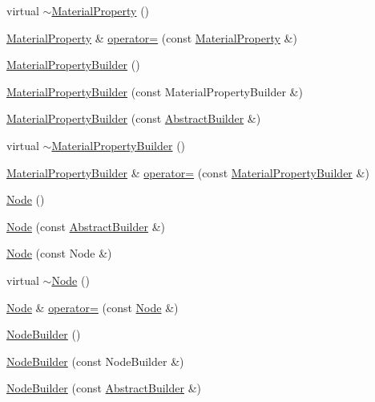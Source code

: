 \begin{DoxyCompactItemize}
\item 
virtual \hyperlink{namespacejli_a79beb0a52804d6f437114e88a6a133f3}{$\sim$\+Material\+Property} ()
\item 
\hyperlink{namespacejli_aac4773f4081fe5e6116c6e85803b59e0}{Material\+Property} \& \hyperlink{namespacejli_aeefe2ec73e0e0a8ec963ff328b8b7008}{operator=} (const \hyperlink{namespacejli_aac4773f4081fe5e6116c6e85803b59e0}{Material\+Property} \&)
\item 
\hyperlink{namespacejli_a96c22be2baa4ce5a1d9759cb6165b155}{Material\+Property\+Builder} ()
\item 
\hyperlink{namespacejli_aac6faf9ab92632aac5d6e880e2b00c6f}{Material\+Property\+Builder} (const Material\+Property\+Builder \&)
\item 
\hyperlink{namespacejli_a3e8b5f64fd8e55aabc11e1bd4d65035d}{Material\+Property\+Builder} (const \hyperlink{classjli_1_1_abstract_builder}{Abstract\+Builder} \&)
\item 
virtual \hyperlink{namespacejli_a7bde168b5814dd6f64f8b5259e0b0ff6}{$\sim$\+Material\+Property\+Builder} ()
\item 
\hyperlink{namespacejli_a96c22be2baa4ce5a1d9759cb6165b155}{Material\+Property\+Builder} \& \hyperlink{namespacejli_aa54ffee03b6511da6a96faa055b0275f}{operator=} (const \hyperlink{namespacejli_a96c22be2baa4ce5a1d9759cb6165b155}{Material\+Property\+Builder} \&)
\item 
\hyperlink{namespacejli_ad3ae8427886d6e7375c62a7fb2100c4c}{Node} ()
\item 
\hyperlink{namespacejli_ac427b39c9353f0301e191f76d360d4f1}{Node} (const \hyperlink{classjli_1_1_abstract_builder}{Abstract\+Builder} \&)
\item 
\hyperlink{namespacejli_ad63185457aa77be28b780050799426f3}{Node} (const Node \&)
\item 
virtual \hyperlink{namespacejli_ac46db977b2fba42d8384ccab749c9cd4}{$\sim$\+Node} ()
\item 
\hyperlink{namespacejli_ad3ae8427886d6e7375c62a7fb2100c4c}{Node} \& \hyperlink{namespacejli_a89c4ecf3f3675ba37131cae61a631143}{operator=} (const \hyperlink{namespacejli_ad3ae8427886d6e7375c62a7fb2100c4c}{Node} \&)
\item 
\hyperlink{namespacejli_a1a43fda7f472452c5ded41130fe22e58}{Node\+Builder} ()
\item 
\hyperlink{namespacejli_a75dc0cad5c84f4d244d951b48255c6e4}{Node\+Builder} (const Node\+Builder \&)
\item 
\hyperlink{namespacejli_a3250e1d2e7ab6f0467839d9ff2f57dcb}{Node\+Builder} (const \hyperlink{classjli_1_1_abstract_builder}{Abstract\+Builder} \&)

\end{DoxyCompactItemize}
